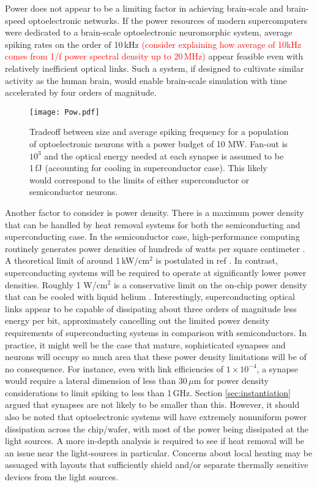 \documentclass[twocolumn]{article}
\begin{document}
Power does not appear to be a limiting factor in achieving brain-scale and brain-speed optoelectronic networks. If the power resources of modern supercomputers were dedicated to a brain-scale optoelectronic neuromorphic system, average spiking rates on the order of 10\,kHz \textcolor{red}{(consider explaining how average of 10kHz comes from 1/f power spectral density up to 20\,MHz)} appear feasible even with relatively inefficient optical links. Such a system, if designed to cultivate similar activity as the human brain, would enable brain-scale simulation with time accelerated by four orders of magnitude.

\begin{figure}[h!]
    \centering
    \texttt{[image: Pow.pdf]}
    \caption{Tradeoff between size and average spiking frequency for a population of optoelectronic neurons with a power budget of 10 MW. Fan-out is $10^3$ and the optical energy needed at each synapse is assumed to be 1\,fJ (accounting for cooling in superconductor case). This likely would correspond to the limits of either superconductor or semiconductor neurons.}
    \label{fig:freq_size}
\end{figure}

Another factor to consider is power density. There is a maximum power density that can be handled by heat removal systems for both the semiconducting and superconducting case. In the semiconductor case, high-performance computing routinely generates power densities of hundreds of watts per square centimeter \cite{tolpygo2016superconductor}. A theoretical limit of around 1\,kW/cm$^2$ is postulated in ref \cite{zhirnov2003limits}. In contrast, superconducting systems will be required to operate at significantly lower power densities. Roughly 1 W/cm$^2$ is a conservative limit on the on-chip power density that can be cooled with liquid helium \cite{tolpygo2016superconductor}. Interestingly, superconducting optical links appear to be capable of dissipating about three orders of magnitude less energy per bit, approximately cancelling out the limited power density requirements of superconducting systems in comparison with semiconductors. In practice, it might well be the case that mature, sophisticated synapses and neurons will occupy so much area that these power density limitations will be of no consequence. For instance, even with link efficiencies of $1 \times 10^{-4}$, a synapse would require a lateral dimension of less than 30\,$\mu$m for power density considerations to limit spiking to less than 1\,GHz. Section \ref{sec:instantiation} argued that synapses are not likely to be smaller than this. However, it should also be noted that optoelectronic systems will have extremely nonuniform power dissipation across the chip/wafer, with most of the power being dissipated at the light sources. A more in-depth analysis is required to see if heat removal will be an issue near the light-sources in particular. Concerns about local heating may be assuaged with layouts that sufficiently shield and/or separate thermally sensitive devices from the light sources.
\end{document}

